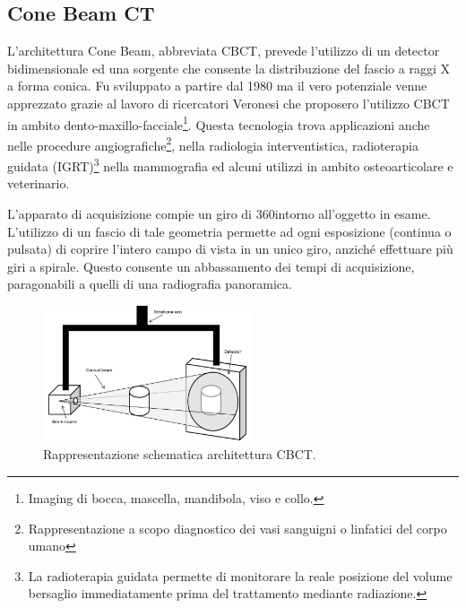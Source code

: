 \documentclass[a4paper,12pt, doubleside]{report}
\begin{document}
            \subsection{Cone Beam CT}
                \par
                    L'architettura Cone Beam, abbreviata CBCT, prevede l'utilizzo di un detector bidimensionale ed una sorgente che consente la distribuzione del fascio a raggi X a forma conica. Fu sviluppato a partire dal 1980 ma il vero potenziale venne apprezzato grazie al lavoro di ricercatori Veronesi che proposero l'utilizzo CBCT in ambito dento-maxillo-facciale\footnote{Imaging di bocca, mascella, mandibola, viso e collo.}. Questa tecnologia trova applicazioni anche nelle procedure angiografiche\footnote{Rappresentazione a scopo diagnostico dei vasi sanguigni o linfatici del corpo umano}, nella radiologia interventistica, radioterapia guidata (IGRT)\footnote{La radioterapia guidata permette di monitorare la reale posizione del volume bersaglio immediatamente prima del trattamento mediante radiazione.} nella mammografia ed alcuni utilizzi in ambito osteoarticolare e veterinario.
                
                \bigskip
                \par
                    L'apparato di acquisizione compie un giro di 360\degree intorno all'oggetto in esame. L'utilizzo di un fascio di tale geometria permette ad ogni esposizione (continua o pulsata) di coprire l'intero campo di vista in un unico giro, anziché effettuare più giri a spirale. Questo consente un abbassamento dei tempi di acquisizione, paragonabili a quelli di una radiografia panoramica.
                                   
                    \begin{figure}[h]
                        \centering
                        \includegraphics[width=0.55\textwidth]{cone_beam}
                        \caption{Rappresentazione schematica architettura CBCT.}
                        \label{fig:spirale}
                    \end{figure}
                    
\end{document}
